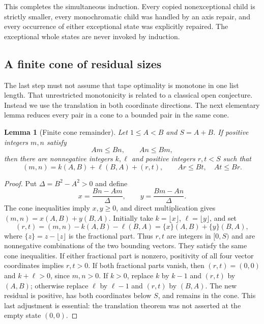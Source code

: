 \documentclass[11pt]{article}
\newtheorem{lemma}[theorem]{Lemma}
\theoremstyle{definition}
\theoremstyle{remark}
\begin{document}
This completes the simultaneous induction. Every copied nonexceptional
child is strictly smaller, every monochromatic child was handled by an
axis repair, and every occurrence of either exceptional state was explicitly
repaired. The exceptional whole states are never invoked by induction.

\subsection{A finite cone of residual sizes}
The last step must not assume that tape optimality is monotone in one list
length. That unrestricted monotonicity is related to a classical open
conjecture. Instead we use the translation in both coordinate directions.
The next elementary lemma reduces every pair in a cone to a bounded pair
in the same cone.

\begin{lemma}[Finite cone remainder]
\label{lem:cone-remainder}
Let $1\le A<B$ and $S=A+B$. If positive integers $m,n$ satisfy
\[
 A m\le B n,\qquad A n\le B m,
\]
then there are nonnegative integers $k,\ell$ and positive integers $r,t<S$
such that
\[
 (m,n)=k(A,B)+\ell(B,A)+(r,t),
 \qquad A r\le B t,\quad A t\le B r.
\]
\end{lemma}
\begin{proof}
Put $\Delta=B^2-A^2>0$ and define
\[
 x=\frac{Bn-Am}{\Delta},\qquad
 y=\frac{Bm-An}{\Delta}.
\]
The cone inequalities imply $x,y\ge0$, and direct multiplication gives
$(m,n)=x(A,B)+y(B,A)$. Initially take $k=\lfloor x\rfloor$,
$\ell=\lfloor y\rfloor$, and set
\[
 (r,t)=(m,n)-k(A,B)-\ell(B,A)
      =\{x\}(A,B)+\{y\}(B,A),
\]
where $\{z\}=z-\lfloor z\rfloor$ is the fractional part. Thus $r,t$ are
integers in $[0,S)$ and are nonnegative combinations of the two bounding
vectors. They satisfy the same cone inequalities. If either fractional
part is nonzero, positivity of all four vector coordinates implies
$r,t>0$. If both fractional parts vanish, then $(r,t)=(0,0)$ and
$k+\ell>0$, since $m,n>0$. If $k>0$, replace $k$ by $k-1$ and $(r,t)$ by
$(A,B)$; otherwise replace $\ell$ by $\ell-1$ and $(r,t)$ by $(B,A)$.
The new residual is positive, has both coordinates below $S$, and remains
in the cone. This last adjustment is essential: the translation theorem
was not asserted at the empty state $(0,0)$.
\end{proof}
\end{document}
